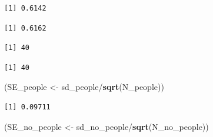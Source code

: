 \documentclass[]{article}
\newenvironment{Shaded}{}{}
\newcommand{\KeywordTok}[1]{\textcolor[rgb]{0.00,0.44,0.13}{\textbf{{#1}}}}
\newcommand{\StringTok}[1]{\textcolor[rgb]{0.25,0.44,0.63}{{#1}}}
\newcommand{\NormalTok}[1]{{#1}}
\begin{document}
\begin{verbatim}
[1] 0.6142
\end{verbatim}

\begin{Shaded}
\end{Shaded}

\begin{verbatim}
[1] 0.6162
\end{verbatim}

\begin{Shaded}
\end{Shaded}

\begin{verbatim}
[1] 40
\end{verbatim}

\begin{Shaded}
\end{Shaded}

\begin{verbatim}
[1] 40
\end{verbatim}

\begin{Shaded}
\begin{Highlighting}[]
\NormalTok{(SE_people <-}\StringTok{ }\NormalTok{sd_people/}\KeywordTok{sqrt}\NormalTok{(N_people))}
\end{Highlighting}
\end{Shaded}

\begin{verbatim}
[1] 0.09711
\end{verbatim}

\begin{Shaded}
\begin{Highlighting}[]
\NormalTok{(SE_no_people <-}\StringTok{ }\NormalTok{sd_no_people/}\KeywordTok{sqrt}\NormalTok{(N_no_people))}
\end{Highlighting}
\end{Shaded}
\end{document}
